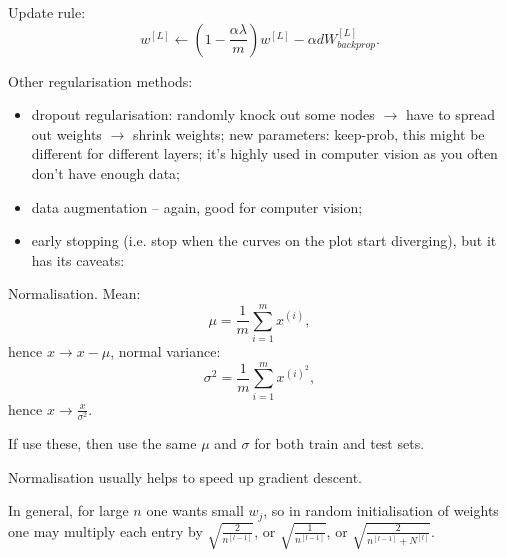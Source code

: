 \documentclass[a4paper,11pt]{article}
\begin{document}
Update rule:
\begin{equation}
w^{[L]} \leftarrow \left(1 - \frac{\alpha \lambda}{m} \right) w^{[L]} - \alpha dW^{[L]} _{backprop} .
\end{equation}

Other regularisation methods:
\begin{itemize}
\item dropout regularisation: randomly knock out some nodes $\rightarrow$ have to spread out weights $\rightarrow$ shrink weights; new parameters: keep-prob, this might be different for different layers; it's highly used in computer vision as you often don't have enough data;
\item data augmentation -- again, good for computer vision;
\item early stopping (i.e. stop when the curves on the plot start diverging), but it has its caveats:

\end{itemize}

Normalisation. Mean:
\begin{equation}
\mu = \frac{1}{m} \sum_{i=1} ^m x^{(i)} ,
\end{equation}
hence \textcolor{OliveGreen}{$x \rightarrow x - \mu$}, normal variance:
\begin{equation}
\sigma^2 = \frac{1}{m} \sum_{i=1} ^m x^{(i)^2} ,
\end{equation}
hence \textcolor{OliveGreen}{$x \rightarrow \frac{x}{\sigma^2}$}.

If use these, then use the same \textcolor{OliveGreen}{$\mu$} and \textcolor{OliveGreen}{$\sigma$} for both train and test sets.

Normalisation usually helps to speed up gradient descent.

In general, for large \textcolor{OliveGreen}{$n$} one wants small \textcolor{OliveGreen}{$w_j$}, so in random initialisation of weights one may multiply each entry by \textcolor{OliveGreen}{$\sqrt{\frac{2}{n^{[l-1]}}}$}, or \textcolor{OliveGreen}{$\sqrt{\frac{1}{n^{[l-1]}}}$}, or \textcolor{OliveGreen}{$\sqrt{\frac{2}{n^{[l-1]}+N^{[l]}}}$}.
\end{document}
